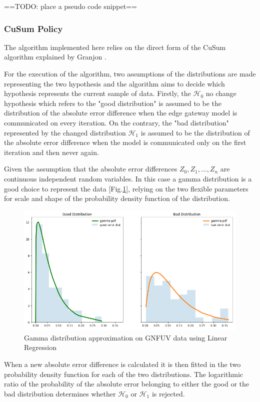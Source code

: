 \documentclass{mpaper}
\begin{document}
==TODO: place a pseudo code snippet==

\subsubsection{CuSum Policy}
The algorithm implemented here relies on the direct form of the CuSum algorithm explained by Granjon \cite{cusum_pierre}.

For the execution of the algorithm, two assumptions of the distributions are made representing the two hypothesis and the algorithm aims to decide which hypothesis represents the current sample of data. 
Firstly, the $\mathcal{H}_0$ no change hypothesis which refers to the "good distribution" is assumed to be the distribution of the absolute error difference when the edge gateway model is communicated on every iteration. On the contrary, the "bad distribution" represented by the changed distribution $\mathcal{H}_1$ is assumed to be the distribution of the absolute error difference when the model is communicated only on the first iteration and then never again.

Given the assumption that the absolute error differences $Z_0, Z_1, \dotsc , Z_n $ are continuous independent random variables. In this case a gamma distribution is a good choice to represent the data  [Fig.\ref{fig:goodvsbad}], relying on the two flexible parameters for scale and shape of the probability density function of the distribution.

\begin{figure}[h]
    \centering
    \includegraphics[scale=0.3]{imgs/goodVSbad.png}
    \caption{Gamma distribution approximation on GNFUV data using Linear Regression}
    \label{fig:goodvsbad}
\end{figure}

When a new absolute error difference is calculated it is then fitted in the two probability density function for each of the two distributions. The logarithmic ratio of the probability of the absolute error belonging to either the good or the bad distribution determines whether $\mathcal{H}_0$ or $\mathcal{H}_1$ is rejected.
\end{document}
